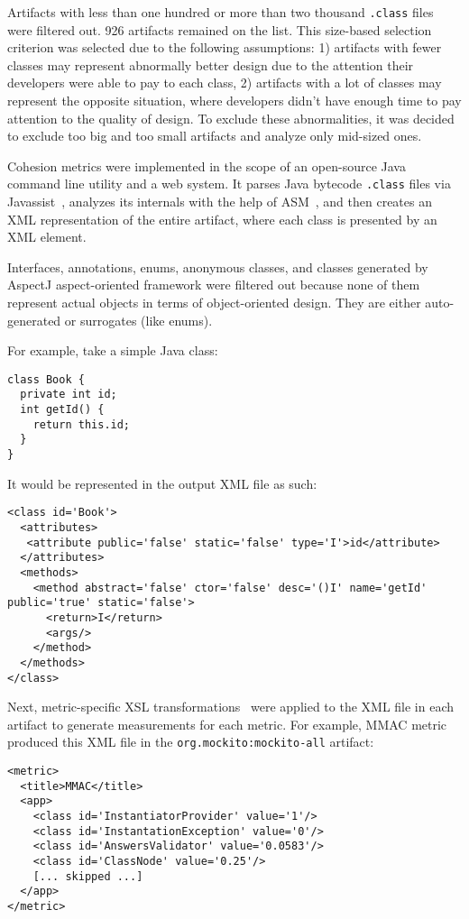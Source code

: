 \documentclass[sigconf,10pt,nonacm=true]{acmart}
\newcommand{\code}[1]{\texttt{#1}}
\begin{document}
Artifacts with less than one hundred or more than two thousand
\code{.class} files were filtered out.
926 artifacts remained on the list.
This size-based selection criterion was selected due to the following
assumptions: 1) artifacts with fewer classes may represent
abnormally better design due to the attention their developers
were able to pay to each class, 2) artifacts with a lot
of classes may represent the opposite situation, where developers
didn't have enough time to pay attention to the quality of design.
To exclude these abnormalities, it was decided to exclude too big
and too small artifacts and analyze only mid-sized ones.

Cohesion metrics were implemented in the scope of
an open-source Java command line utility and a web system.
It parses Java bytecode \code{.class} files via Javassist~\citep{chiba98},
analyzes its internals with the help of ASM~\citep{bruneton02},
and then creates an XML representation of the entire artifact,
where each class is presented by an XML element.

Interfaces, annotations, enums, anonymous classes,
and classes generated by AspectJ aspect-oriented
framework were filtered out because none of them represent
actual objects in terms of object-oriented design. They are either
auto-generated or surrogates (like enums).

For example, take a simple Java class:

\begin{verbatim}
class Book {
  private int id;
  int getId() {
    return this.id;
  }
}
\end{verbatim}

It would be represented in the output XML file as such:

\begin{verbatim}
<class id='Book'>
  <attributes>
   <attribute public='false' static='false' type='I'>id</attribute>
  </attributes>
  <methods>
    <method abstract='false' ctor='false' desc='()I' name='getId' public='true' static='false'>
      <return>I</return>
      <args/>
    </method>
  </methods>
</class>
\end{verbatim}

Next, metric-specific XSL transformations~\citep{kay00} were applied to the XML file
in each artifact to generate measurements for each metric.
For example, MMAC metric produced this XML file in
the \code{org.mockito:mockito-all} artifact:

\begin{verbatim}
<metric>
  <title>MMAC</title>
  <app>
    <class id='InstantiatorProvider' value='1'/>
    <class id='InstantationException' value='0'/>
    <class id='AnswersValidator' value='0.0583'/>
    <class id='ClassNode' value='0.25'/>
    [... skipped ...]
  </app>
</metric>
\end{verbatim}
\end{document}
